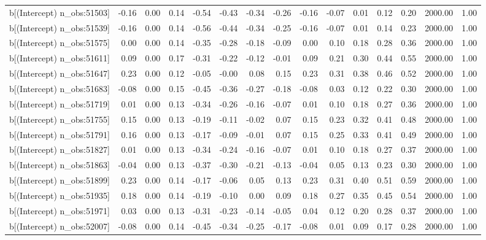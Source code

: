 \begin{table}[ht]
\begin{tabular}{rrrrrrrrrrrrrrr}
  b[(Intercept) n\_obs:51503] & -0.16 & 0.00 & 0.14 & -0.54 & -0.43 & -0.34 & -0.26 & -0.16 & -0.07 & 0.01 & 0.12 & 0.20 & 2000.00 & 1.00 \\ 
  b[(Intercept) n\_obs:51539] & -0.16 & 0.00 & 0.14 & -0.56 & -0.44 & -0.34 & -0.25 & -0.16 & -0.07 & 0.01 & 0.14 & 0.23 & 2000.00 & 1.00 \\ 
  b[(Intercept) n\_obs:51575] & 0.00 & 0.00 & 0.14 & -0.35 & -0.28 & -0.18 & -0.09 & 0.00 & 0.10 & 0.18 & 0.28 & 0.36 & 2000.00 & 1.00 \\ 
  b[(Intercept) n\_obs:51611] & 0.09 & 0.00 & 0.17 & -0.31 & -0.22 & -0.12 & -0.01 & 0.09 & 0.21 & 0.30 & 0.44 & 0.55 & 2000.00 & 1.00 \\ 
  b[(Intercept) n\_obs:51647] & 0.23 & 0.00 & 0.12 & -0.05 & -0.00 & 0.08 & 0.15 & 0.23 & 0.31 & 0.38 & 0.46 & 0.52 & 2000.00 & 1.00 \\ 
  b[(Intercept) n\_obs:51683] & -0.08 & 0.00 & 0.15 & -0.45 & -0.36 & -0.27 & -0.18 & -0.08 & 0.03 & 0.12 & 0.22 & 0.30 & 2000.00 & 1.00 \\ 
  b[(Intercept) n\_obs:51719] & 0.01 & 0.00 & 0.13 & -0.34 & -0.26 & -0.16 & -0.07 & 0.01 & 0.10 & 0.18 & 0.27 & 0.36 & 2000.00 & 1.00 \\ 
  b[(Intercept) n\_obs:51755] & 0.15 & 0.00 & 0.13 & -0.19 & -0.11 & -0.02 & 0.07 & 0.15 & 0.23 & 0.32 & 0.41 & 0.48 & 2000.00 & 1.00 \\ 
  b[(Intercept) n\_obs:51791] & 0.16 & 0.00 & 0.13 & -0.17 & -0.09 & -0.01 & 0.07 & 0.15 & 0.25 & 0.33 & 0.41 & 0.49 & 2000.00 & 1.00 \\ 
  b[(Intercept) n\_obs:51827] & 0.01 & 0.00 & 0.13 & -0.34 & -0.24 & -0.16 & -0.07 & 0.01 & 0.10 & 0.18 & 0.27 & 0.37 & 2000.00 & 1.00 \\ 
  b[(Intercept) n\_obs:51863] & -0.04 & 0.00 & 0.13 & -0.37 & -0.30 & -0.21 & -0.13 & -0.04 & 0.05 & 0.13 & 0.23 & 0.30 & 2000.00 & 1.00 \\ 
  b[(Intercept) n\_obs:51899] & 0.23 & 0.00 & 0.14 & -0.17 & -0.06 & 0.05 & 0.13 & 0.23 & 0.31 & 0.40 & 0.51 & 0.59 & 2000.00 & 1.00 \\ 
  b[(Intercept) n\_obs:51935] & 0.18 & 0.00 & 0.14 & -0.19 & -0.10 & 0.00 & 0.09 & 0.18 & 0.27 & 0.35 & 0.45 & 0.54 & 2000.00 & 1.00 \\ 
  b[(Intercept) n\_obs:51971] & 0.03 & 0.00 & 0.13 & -0.31 & -0.23 & -0.14 & -0.05 & 0.04 & 0.12 & 0.20 & 0.28 & 0.37 & 2000.00 & 1.00 \\ 
  b[(Intercept) n\_obs:52007] & -0.08 & 0.00 & 0.14 & -0.45 & -0.34 & -0.25 & -0.17 & -0.08 & 0.01 & 0.09 & 0.17 & 0.28 & 2000.00 & 1.00 \\ 

\end{tabular}
\end{table}
